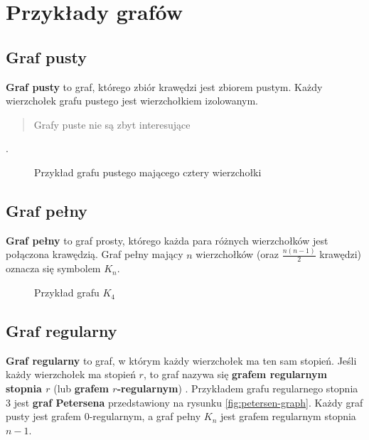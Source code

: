 \section{Przykłady grafów} \label{sec:common-graphs}

\subsection*{Graf pusty}

\textbf{Graf pusty} to graf, którego zbiór krawędzi jest zbiorem pustym. Każdy wierzchołek grafu pustego jest wierzchołkiem izolowanym. \blockquote{Grafy puste nie są zbyt interesujące} \cite[30]{wilson}.

\begin{figure}[h]
\centering
{}
\captionsetup{justification=centering}
\caption{Przykład grafu pustego mającego cztery wierzchołki} \label{fig:empty-graph-example}
\end{figure}

\subsection*{Graf pełny}

\textbf{Graf pełny} to graf prosty, którego każda para różnych wierzchołków jest połączona krawędzią. Graf pełny mający $n$ wierzchołków (oraz $\frac{n(n-1)}{2}$ krawędzi) oznacza się symbolem $K_n$. 

\begin{figure}[h]
\centering
{}
\captionsetup{justification=centering}
\caption{Przykład grafu $K_4$} \label{fig:complete-graph-example}
\end{figure}

\subsection*{Graf regularny}

\textbf{Graf regularny} to graf, w którym każdy wierzchołek ma ten sam stopień. Jeśli każdy wierzchołek ma stopień $r$, to graf nazywa się \textbf{grafem regularnym stopnia $r$} (lub \textbf{grafem $r$-regularnym}) \cite[31]{wilson}. Przykładem grafu regularnego stopnia 3 jest \textbf{graf Petersena} przedstawiony na rysunku \ref{fig:petersen-graph}. Każdy graf pusty jest grafem $0$-regularnym, a graf pełny $K_n$ jest grafem regularnym stopnia $n-1$. 

